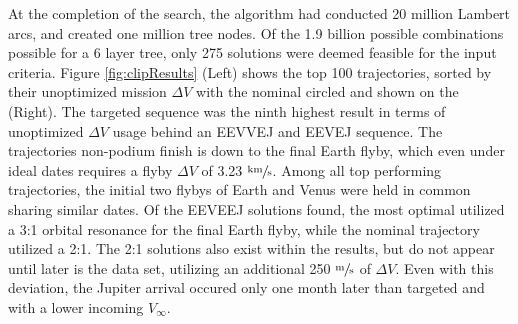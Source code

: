 \documentclass[letterpaper, preprint, paper,11pt]{AAS}	%
\begin{document}
At the completion of the search, the algorithm had conducted 20 million Lambert arcs, and created one million tree nodes. Of the 1.9 billion possible combinations possible for a 6 layer tree, only 275 solutions were deemed feasible for the input criteria. Figure \ref*{fig:clipResults} (Left) shows the top 100 trajectories, sorted by their unoptimized mission $\Delta V$ with the nominal circled and shown on the (Right). The targeted sequence was the ninth highest result in terms of unoptimized $\Delta V$ usage behind an EEVVEJ and EEVEJ sequence. The trajectories non-podium finish is down to the final Earth flyby, which even under ideal dates requires a flyby $\Delta V$ of 3.23 $\sfrac{\text{km}}{\text{s}}$. Among all top performing trajectories, the initial two flybys of Earth and Venus were held in common sharing similar dates. Of the EEVEEJ solutions found, the most optimal utilized a 3:1 orbital resonance for the final Earth flyby, while the nominal trajectory utilized a 2:1. The 2:1 solutions also exist within the results, but do not appear until later is the data set, utilizing an additional 250 $\sfrac{\text{m}}{\text{s}}$ of $\Delta V$. Even with this deviation, the Jupiter arrival occured only one month later than targeted and with a lower incoming $V_\infty$.
\end{document}
